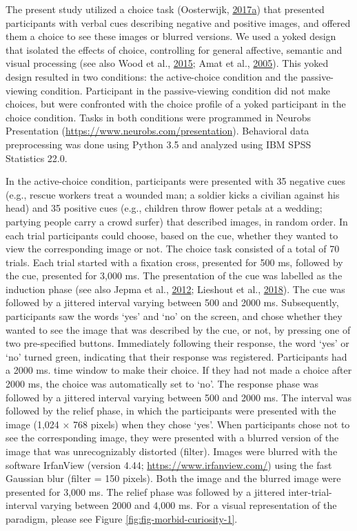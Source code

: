 \documentclass[11pt,american,a4paper,oneside,]{memoir} %
\begin{document}
The present study utilized a choice task (Oosterwijk, \protect\hyperlink{ref-oosterwijk2017choosing}{2017}\protect\hyperlink{ref-oosterwijk2017choosing}{a}) that presented participants with verbal cues describing negative and positive images, and offered them a choice to see these images or blurred versions. We used a yoked design that isolated the effects of choice, controlling for general affective, semantic and visual processing (see also Wood et al., \protect\hyperlink{ref-wood2015controllability}{2015}; Amat et al., \protect\hyperlink{ref-amat2005medial}{2005}). This yoked design resulted in two conditions: the active-choice condition and the passive-viewing condition. Participant in the passive-viewing condition did not make choices, but were confronted with the choice profile of a yoked participant in the choice condition. Tasks in both conditions were programmed in Neurobs Presentation (\url{https://www.neurobs.com/presentation}). Behavioral data preprocessing was done using Python 3.5 and analyzed using IBM SPSS Statistics 22.0.

In the active-choice condition, participants were presented with 35 negative cues (e.g., rescue workers treat a wounded man; a soldier kicks a civilian against his head) and 35 positive cues (e.g., children throw flower petals at a wedding; partying people carry a crowd surfer) that described images, in random order. In each trial participants could choose, based on the cue, whether they wanted to view the corresponding image or not. The choice task consisted of a total of 70 trials. Each trial started with a fixation cross, presented for 500 ms, followed by the cue, presented for 3,000 ms. The presentation of the cue was labelled as the induction phase (see also Jepma et al., \protect\hyperlink{ref-jepma2012neural}{2012}; Lieshout et al., \protect\hyperlink{ref-van2018induction}{2018}). The cue was followed by a jittered interval varying between 500 and 2000 ms. Subsequently, participants saw the words `yes' and `no' on the screen, and chose whether they wanted to see the image that was described by the cue, or not, by pressing one of two pre-specified buttons. Immediately following their response, the word `yes' or `no' turned green, indicating that their response was registered. Participants had a 2000 ms. time window to make their choice. If they had not made a choice after 2000 ms, the choice was automatically set to `no'. The response phase was followed by a jittered interval varying between 500 and 2000 ms. The interval was followed by the relief phase, in which the participants were presented with the image (1,024 × 768 pixels) when they chose `yes'. When participants chose not to see the corresponding image, they were presented with a blurred version of the image that was unrecognizably distorted (filter). Images were blurred with the software IrfanView (version 4.44; \url{https://www.irfanview.com/}) using the fast Gaussian blur (filter = 150 pixels). Both the image and the blurred image were presented for 3,000 ms. The relief phase was followed by a jittered inter-trial-interval varying between 2000 and 4,000 ms. For a visual representation of the paradigm, please see Figure \ref{fig:fig-morbid-curiosity-1}.
\end{document}
